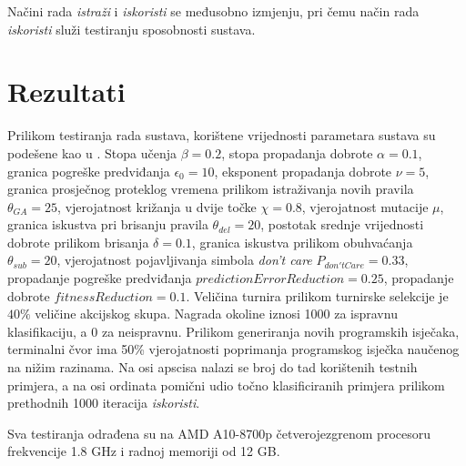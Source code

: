 \documentclass[times, utf8, zavrsni]{fer}
\begin{document}
Načini rada \emph{istraži} i \emph{iskoristi} se međusobno izmjenju, pri čemu način rada \emph{iskoristi} služi testiranju sposobnosti sustava.

\chapter{Rezultati} \label{ch:res}
Prilikom testiranja rada sustava, korištene vrijednosti parametara sustava su podešene kao u \citep{4}.
Stopa učenja $\beta = 0.2$, stopa propadanja dobrote $\alpha = 0.1$, granica pogreške predviđanja $\epsilon_{0} = 10$, eksponent propadanja dobrote $\nu = 5$, granica prosječnog proteklog vremena prilikom istraživanja novih pravila $\theta_{GA} = 25$, vjerojatnost križanja u dvije točke $\chi = 0.8$, vjerojatnost mutacije $\mu$, granica iskustva pri brisanju pravila $\theta_{del} = 20$, postotak srednje vrijednosti dobrote prilikom brisanja $\delta = 0.1$, granica iskustva prilikom obuhvaćanja $\theta_{sub} = 20$, vjerojatnost pojavljivanja simbola \emph{don't care} $P_{don'tCare} = 0.33$, propadanje pogreške predviđanja $predictionErrorReduction = 0.25$, propadanje dobrote $fitnessReduction = 0.1$.
Veličina turnira prilikom turnirske selekcije je $40\%$ veličine akcijskog skupa.
Nagrada okoline iznosi 1000 za ispravnu klasifikaciju, a 0 za neispravnu.
Prilikom generiranja novih programskih isječaka, terminalni čvor ima 50\% vjerojatnosti poprimanja programskog isječka naučenog na nižim razinama.
Na osi apscisa nalazi se broj do tad korištenih testnih primjera, a na osi ordinata pomični udio točno klasificiranih primjera prilikom prethodnih 1000 iteracija \emph{iskoristi}.

Sva testiranja odrađena su na AMD A10-8700p četverojezgrenom procesoru frekvencije 1.8 GHz i radnoj memoriji od 12 GB.
\end{document}
